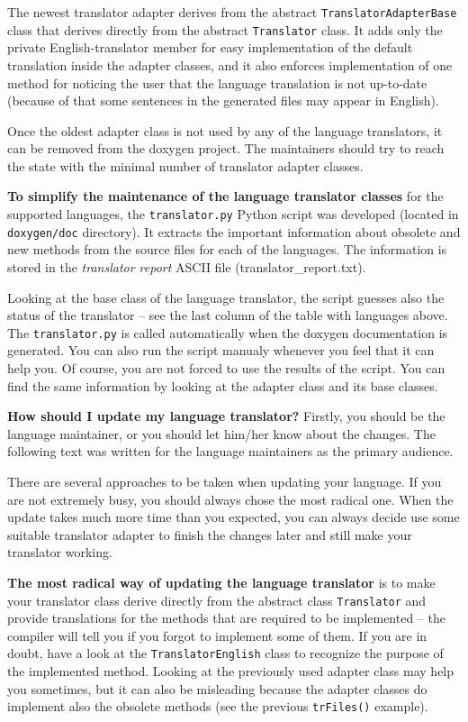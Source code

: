 The newest translator adapter derives from the abstract {\tt TranslatorAdapterBase} class that derives directly from the abstract {\tt Translator} class. It adds only the private English-translator member for easy implementation of the default translation inside the adapter classes, and it also enforces implementation of one method for noticing the user that the language translation is not up-to-date (because of that some sentences in the generated files may appear in English).

Once the oldest adapter class is not used by any of the language translators, it can be removed from the doxygen project. The maintainers should try to reach the state with the minimal number of translator adapter classes.

{\bf To simplify the maintenance of the language translator classes} for the supported languages, the {\tt translator.py} Python script was developed (located in {\tt doxygen/doc} directory). It extracts the important information about obsolete and new methods from the source files for each of the languages. The information is stored in the {\em translator report\/} ASCII file (translator\_\-report.txt). 

Looking at the base class of the language translator, the script guesses also the status of the translator -- see the last column of the table with languages above. The {\tt translator.py} is called automatically when the doxygen documentation is generated. You can also run the script manualy whenever you feel that it can help you. Of course, you are not forced to use the results of the script. You can find the same information by looking at the adapter class and its base classes.

{\bf How should I update my language translator?} Firstly, you should be the language maintainer, or you should let him/her know about the changes. The following text was written for the language maintainers as the primary audience.

There are several approaches to be taken when updating your language. If you are not extremely busy, you should always chose the most radical one. When the update takes much more time than you expected, you can always decide use some suitable translator adapter to finish the changes later and still make your translator working.

{\bf The most radical way of updating the language translator} is to make your translator class derive directly from the abstract class {\tt Translator} and provide translations for the methods that are required to be implemented -- the compiler will tell you if you forgot to implement some of them. If you are in doubt, have a look at the {\tt TranslatorEnglish} class to recognize the purpose of the implemented method. Looking at the previously used adapter class may help you sometimes, but it can also be misleading because the adapter classes do implement also the obsolete methods (see the previous {\tt trFiles()} example).

